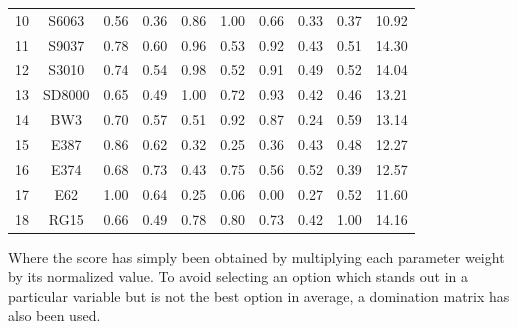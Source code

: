 \documentclass[../TFG_Annex.tex]{subfiles}
\begin{document}
\begin{table}[h!]
\begin{tabular}{cc|C{1.2cm}|C{1.2cm}|C{1.2cm}|C{1.2cm}|C{1.2cm}|C{1.2cm}|C{1.2cm}|C{1.5cm}}
		10              & S6063              & 0.56          & 0.36          & 0.86          & 1.00          & 0.66          & 0.33          & 0.37          & 10.92                        \\
		11              & S9037              & 0.78          & 0.60          & 0.96          & 0.53          & 0.92          & 0.43          & 0.51          & 14.30                        \\
		12              & S3010              & 0.74          & 0.54          & 0.98          & 0.52          & 0.91          & 0.49          & 0.52          & 14.04                        \\
		13              & SD8000             & 0.65          & 0.49          & 1.00          & 0.72          & 0.93          & 0.42          & 0.46          & 13.21                        \\
		14              & BW3                & 0.70          & 0.57          & 0.51          & 0.92          & 0.87          & 0.24          & 0.59          & 13.14                        \\
		15              & E387               & 0.86          & 0.62          & 0.32          & 0.25          & 0.36          & 0.43          & 0.48          & 12.27                        \\
		16              & E374               & 0.68          & 0.73          & 0.43          & 0.75          & 0.56          & 0.52          & 0.39          & 12.57                        \\
		17              & E62                & 1.00          & 0.64          & 0.25          & 0.06          & 0.00          & 0.27          & 0.52          & 11.60                        \\
		18              & RG15               & 0.66          & 0.49          & 0.78          & 0.80          & 0.73          & 0.42          & 1.00          & 14.16                       
	\end{tabular}
\end{table}

Where the score has simply been obtained by multiplying each parameter weight by its normalized value. To avoid selecting an option which stands out in a particular variable but is not the best option in average, a domination matrix has also been used. 


 

 
\end{document}
